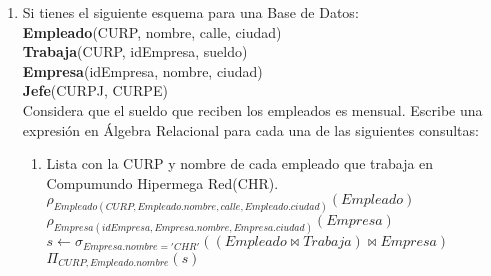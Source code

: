 \documentclass{article}
\begin{document}
\begin{enumerate}
\begin{enumerate}
				\begin{enumerate}
					\item Pinturas
					
					$p \leftarrow ((((Pintura \bowtie_{idObra=PinturaidObra}(Pintura\_Tipo)) \bowtie_{idObra=PinturaidObra} Pintura\_Estilo) \bowtie_{idObra=PinturaidObra}(Pintura\_Material))\bowtie_{ArtistasNombre=Nombre}(Artistas)) \bowtie f$
					
					\item Esculturas
					
					$e \leftarrow (Escultura \bowtie_{idObra=EsculturaidObra}(Escultura\_Tipo)) \bowtie_{ArtistasNombre=Nombre}(Artistas)) \bowtie f$					
					
					\item Miscelaneas
					
					$m \leftarrow ((Miscelanea \bowtie_{idObra=MiscelaneaidObra} Miscelanea\_Estilo) \bowtie_{ArtistasNombre=Nombre}(Artistas)) \bowtie f$					
					
				\end{enumerate}
				
			\end{enumerate}
		En caso de que el esquema no cubra los puntos anteriores, indica la modificación (o
		modificaciones) que se tendrían que hacer. Incluye Modelo Relacional modificado (sí es el caso).
		Debes indicar la solución en álgebra relacional para las consultas que se solicitan.
		\item Si tienes el siguiente esquema para una Base de Datos:\\

		\textbf{Empleado}(CURP, nombre, calle, ciudad)\\
		\textbf{Trabaja}(CURP, idEmpresa, sueldo)\\
		\textbf{Empresa}(idEmpresa, nombre, ciudad)\\
		\textbf{Jefe}(CURPJ, CURPE)\\
		
		Considera que el sueldo que reciben los empleados es mensual. Escribe una expresión en Álgebra Relacional para cada una de las siguientes consultas:
		
			\begin{enumerate}
				\item Lista con la CURP y nombre de cada empleado que trabaja en Compumundo Hipermega Red(CHR).\\
				
				$\rho_{Empleado(CURP, Empleado.nombre, calle, Empleado.ciudad)}(Empleado)$\\
				$\rho_{Empresa(idEmpresa, Empresa.nombre, Empresa.ciudad)}(Empresa)$\\
				$s \leftarrow \sigma_{Empresa.nombre = 'CHR'}((Empleado \bowtie Trabaja) \bowtie Empresa)$\\
				$\Pi_{CURP, Empleado.nombre}(s)$\\
				

\end{enumerate}
\end{enumerate}
\end{document}
